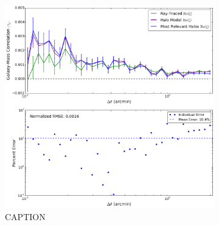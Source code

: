 \documentclass[%
 reprint,
 amsmath,amssymb,
 aps,nofootinbib
]{revtex4-1}
\begin{document}
\begin{figure}
\begin{subfigure}{0.475\textwidth}
        \label{fig:rel_gg_compare}
    \end{subfigure}
    ~~
    \begin{subfigure}{0.475\textwidth}
        \includegraphics[width=\textwidth]{figs-swe/thesis/rel_ng_compare.png}
        \captionsetup{justification=raggedright,singlelinecheck=false}
        \caption{CAPTION}
        \label{fig:rel_ng_compare}
    \end{subfigure}
    \caption{}
    \label{fig:rel_corr}
\end{figure}

\end{document}
